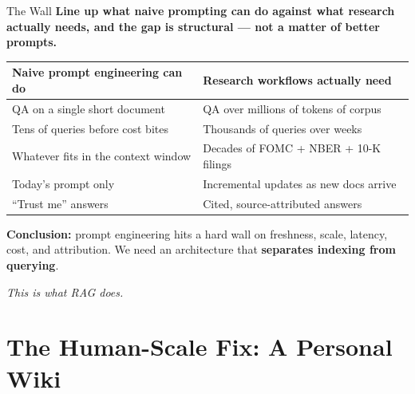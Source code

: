\begin{frame}{The Wall}
\textbf{Line up what naive prompting can do against what research actually needs, and the gap is structural --- not a matter of better prompts.}

\medskip
\begin{center}
\renewcommand{\arraystretch}{1.4}
\begin{tabular}{|p{5.5cm}|p{8cm}|}
\hline
\textbf{Naive prompt engineering can do} & \textbf{Research workflows actually need} \\
\hline
QA on a single short document & QA over millions of tokens of corpus \\
\hline
Tens of queries before cost bites & Thousands of queries over weeks \\
\hline
Whatever fits in the context window & Decades of FOMC + NBER + 10-K filings \\
\hline
Today's prompt only & Incremental updates as new docs arrive \\
\hline
``Trust me'' answers & Cited, source-attributed answers \\
\hline
\end{tabular}
\end{center}

\medskip
\textbf{Conclusion:} prompt engineering hits a hard wall on freshness, scale, latency, cost, and attribution. We need an architecture that \textbf{separates indexing from querying}.

\medskip
\centering\emph{This is what RAG does.}
\end{frame}

\section{The Human-Scale Fix: A Personal Wiki}

